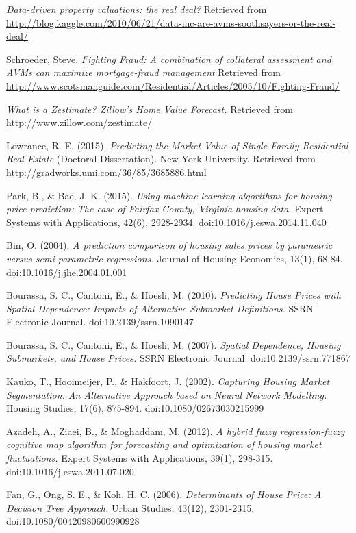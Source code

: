 \documentclass[letter,10pt]{article}
\begin{document}
\begin{multicols}{2}
\begin{thebibliography}{13}
			\textit{Data-driven property valuations: the real deal?}
			Retrieved from \\ \small{\url{http://blog.kaggle.com/2010/06/21/data-inc-are-avms-soothsayers-or-the-real-deal/}}
			
			Schroeder, Steve.
			\textit{Fighting Fraud: A combination of collateral assessment and AVMs can maximize mortgage-fraud management}
			Retrieved from \\ \small{\url{http://www.scotsmanguide.com/Residential/Articles/2005/10/Fighting-Fraud/}}
			
			\textit{What is a Zestimate? Zillow's Home Value Forecast.}
			Retrieved from \\
			\small{\url{http://www.zillow.com/zestimate/}}
			
			Lowrance, R. E. (2015).
			\textit{Predicting the Market Value of Single-Family Residential Real Estate}
			(Doctoral Dissertation). New York University. Retrieved from \small{\url{http://gradworks.umi.com/36/85/3685886.html}}
			
			Park, B., \& Bae, J. K. (2015).
			\textit{Using machine learning algorithms for housing price prediction: The case of Fairfax County, Virginia housing data.}
			Expert Systems with Applications, 42(6), 2928-2934. doi:10.1016/j.eswa.2014.11.040
			
			Bin, O. (2004).
			\textit{A prediction comparison of housing sales prices by parametric versus semi-parametric regressions.}
			Journal of Housing Economics, 13(1), 68-84. doi:10.1016/j.jhe.2004.01.001
			
			Bourassa, S. C., Cantoni, E., \& Hoesli, M. (2010). 
			\textit{Predicting House Prices with Spatial Dependence: Impacts of Alternative Submarket Definitions.}
			SSRN Electronic Journal. doi:10.2139/ssrn.1090147
			
			Bourassa, S. C., Cantoni, E., \& Hoesli, M. (2007).
			\textit{Spatial Dependence, Housing Submarkets, and House Prices.}
			SSRN Electronic Journal. doi:10.2139/ssrn.771867
			
			Kauko, T., Hooimeijer, P., \& Hakfoort, J. (2002).
			\textit{Capturing Housing Market Segmentation: An Alternative Approach based on Neural Network Modelling.}
			Housing Studies, 17(6), 875-894. doi:10.1080/02673030215999
			
			Azadeh, A., Ziaei, B., \& Moghaddam, M. (2012).
			\textit{A hybrid fuzzy regression-fuzzy cognitive map algorithm for forecasting and optimization of housing market fluctuations.}
			Expert Systems with Applications, 39(1), 298-315. doi:10.1016/j.eswa.2011.07.020
			
			Fan, G., Ong, S. E., \& Koh, H. C. (2006).
			\textit{Determinants of House Price: A Decision Tree Approach.}
			Urban Studies, 43(12), 2301-2315. doi:10.1080/00420980600990928
		\end{thebibliography}
	\end{multicols}
\end{document}

